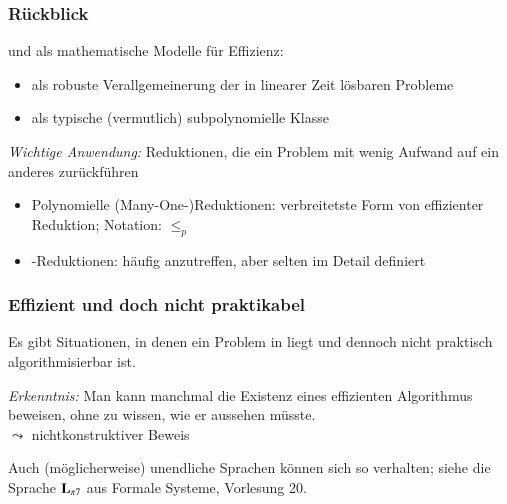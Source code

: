 \documentclass[aspectratio=1610,onlymath]{beamer}
\begin{document}
\maketitle

\begin{frame}\frametitle{Rückblick}

 und  als mathematische Modelle für Effizienz:
\begin{itemize}
\item {} als robuste Verallgemeinerung der in linearer Zeit lösbaren Probleme
\item {} als typische (vermutlich) subpolynomielle Klasse
\end{itemize}\bigskip

\emph{Wichtige Anwendung:} Reduktionen, die ein Problem mit wenig Aufwand auf ein anderes zurückführen
\begin{itemize}
\item \alert{Polynomielle (Many-One-)Reduktionen:} verbreitetste Form von effizienter Reduktion; Notation: $\leq_p$
\item \alert{-Reduktionen:} häufig anzutreffen, aber selten im Detail definiert
\end{itemize}

\end{frame}

\begin{frame}\frametitle{Effizient und doch nicht praktikabel}

Es gibt Situationen, in denen ein Problem in  liegt 
und dennoch nicht praktisch algorithmisierbar ist.\medskip

\bigskip\pause

\pause

\emph{Erkenntnis:} Man kann manchmal die Existenz eines effizienten Algorithmus beweisen,
ohne zu wissen, wie er aussehen müsste.\\
$\leadsto$ \alert{nichtkonstruktiver Beweis}\bigskip

{\tiny Auch (möglicherweise) unendliche Sprachen können sich so verhalten; siehe die Sprache $\textbf{\textcolor{black}{L}}_{\pi7}$ aus Formale Systeme, Vorlesung 20.}

\end{frame}
\end{document}
